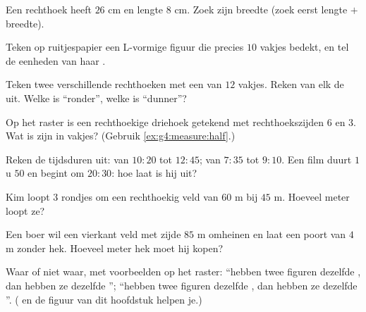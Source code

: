 \begin{exercise}[$\star$]\label{exo:g4:measure:4}
Een rechthoek heeft  $26$ cm en lengte $8$ cm. Zoek zijn breedte (zoek
eerst lengte $+$ breedte).
\end{exercise}

\begin{exercise}[$\star$]\label{exo:g4:measure:5}
Teken op ruitjespapier een L-vormige figuur die precies $10$ vakjes bedekt,
en tel de eenheden van haar .
\end{exercise}

\begin{exercise}[$\star$]\label{exo:g4:measure:6}
Teken twee verschillende rechthoeken met een  van $12$ vakjes.
Reken van elk de  uit. Welke is ``ronder'', welke is ``dunner''?
\end{exercise}

\begin{exercise}[$\star$]\label{exo:g4:measure:7}
Op het raster is een rechthoekige driehoek getekend met rechthoekszijden $6$
en $3$. Wat is zijn  in vakjes? (Gebruik
\cref{ex:g4:measure:half}.)
\end{exercise}

\begin{exercise}[$\star$]\label{exo:g4:measure:8}
Reken de tijdsduren uit: van $10{:}20$ tot $12{:}45$; van $7{:}35$ tot
$9{:}10$. Een film duurt $1$ u $50$ en begint om $20{:}30$: hoe laat is hij
uit?
\end{exercise}

\begin{exercise}[$\star$]\label{exo:g4:measure:9}
Kim loopt $3$ rondjes om een rechthoekig veld van $60$ m bij $45$ m. Hoeveel
meter loopt ze?
\end{exercise}

\begin{exercise}[$\star\star$]\label{exo:g4:measure:10}
Een boer wil een vierkant veld met zijde $85$ m omheinen en laat een poort
van $4$ m zonder hek. Hoeveel meter hek moet hij kopen?
\end{exercise}

\begin{exercise}[$\star\star$]\label{exo:g4:measure:11}
Waar of niet waar, met voorbeelden op het raster: ``hebben twee figuren
dezelfde , dan hebben ze dezelfde ''; ``hebben twee figuren
dezelfde , dan hebben ze dezelfde ''.
( en de figuur van dit hoofdstuk helpen je.)
\end{exercise}
